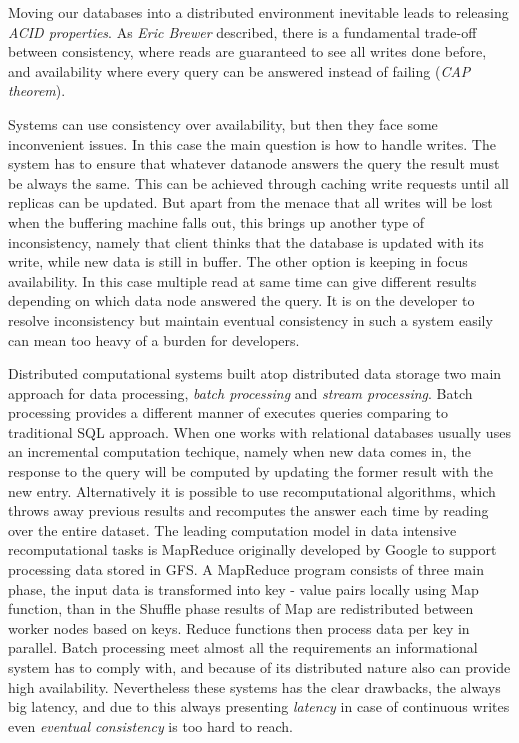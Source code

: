 Moving our databases into a distributed environment inevitable leads to releasing \textit{ACID properties}.  As \textit{Eric Brewer} described, 
there is a fundamental trade-off between consistency, where reads are guaranteed to see all writes done before, and availability where every query 
can be answered instead of failing (\textit{CAP theorem}). 
 
Systems can use consistency over availability, but then they face some inconvenient issues. In this case the main question is how to handle writes.  
The system has to ensure that whatever datanode answers the query the result must be always the same. This can be achieved through caching write requests until all replicas can be updated. But apart from the menace that all writes will be lost when the buffering machine falls out, this brings up another type of inconsistency, 
namely that client thinks that the database is updated with its write, while new data is still in buffer.  
The other option is keeping in focus availability. In this case multiple read at same time can give different results depending on which data node answered the query. 
It is on the developer to resolve inconsistency but maintain eventual consistency in such a system easily can mean too heavy of a burden for developers.


Distributed computational systems built atop distributed data storage two main approach for data processing, \textit{batch processing} and \textit{stream processing}. Batch processing provides a different 
manner of executes queries comparing to traditional SQL approach. When one works with relational databases usually uses an incremental computation techique,
 namely when new data comes in, the response to the query will be computed by updating the former result with the new entry. Alternatively it is possible 
 to use recomputational algorithms, which throws away previous results and recomputes the answer each time by reading over the entire dataset. 
 The leading computation model in data intensive recomputational tasks is MapReduce originally developed by Google to support processing data stored in GFS.
 A MapReduce program consists of three main phase, the input data is transformed into key - value pairs locally using Map function, than in the Shuffle phase results of Map are redistributed between worker nodes based on keys. Reduce functions then 
process data per key in parallel. Batch processing meet almost all the requirements an informational system has to comply with, and because 
 of its distributed nature also can provide high availability. Nevertheless these systems has the clear drawbacks, the always big latency, and due to this always 
 presenting \textit{latency} in case of continuous writes even \textit{eventual consistency} is too hard to reach.
  
